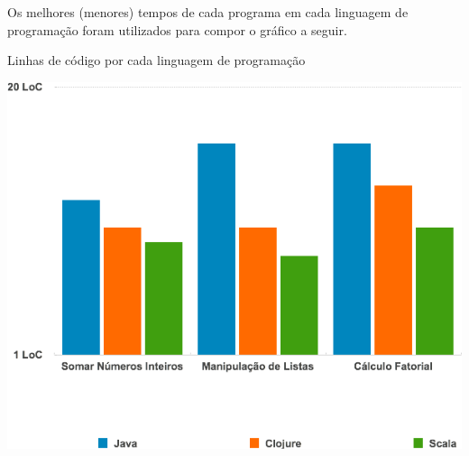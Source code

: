     Os melhores (menores) tempos de cada programa em cada linguagem de programação foram utilizados para compor o gráfico a seguir.

    \begin{grafico}[H]
      \setlength{\abovecaptionskip}{5pt}
      \setlength{\belowcaptionskip}{0pt}
      \caption[Linhas de código por cada linguagem de programação]
        {Linhas de código por cada linguagem de programação}
      \centering
      \includegraphics[width=1\textwidth]{imagem/graficos/grafico2-programas.png}
      \captionsetup[grafico]{justification=centering}
    \end{grafico}
